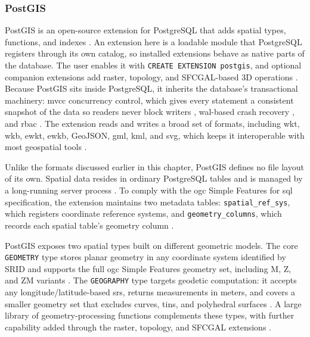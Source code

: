 \subsubsection{PostGIS}
\label{background:spatial-data-formats-and-storage-models:full-database-engines:postgis}
PostGIS is an open-source extension for PostgreSQL that adds spatial types, functions, and indexes \parencite{postgis2024_manual_34}. An extension here is a loadable module that PostgreSQL registers through its own catalog, so installed extensions behave as native parts of the database. The user enables it with \texttt{CREATE EXTENSION postgis}, and optional companion extensions add raster, topology, and SFCGAL-based 3D operations \parencite{postgis2024_manual_34}. Because PostGIS sits inside PostgreSQL, it inherits the database's transactional machinery: \acrshort{mvcc} concurrency control, which gives every statement a consistent snapshot of the data so readers never block writers \parencite{postgresql2024_concurrency_control}, \acrshort{wal}-based crash recovery \parencite{postgresql2024_wal}, and \acrfull{rbac} \parencite{postgresql2024_roles}. The extension reads and writes a broad set of formats, including \acrshort{wkt}, \acrshort{wkb}, \acrfull{ewkt}, \acrfull{ewkb}, GeoJSON, \acrshort{gml}, \acrfull{kml}, and \acrfull{svg}, which keeps it interoperable with most geospatial tools \parencite{postgis2024_manual_34}.

Unlike the formats discussed earlier in this chapter, PostGIS defines no file layout of its own. Spatial data resides in ordinary PostgreSQL tables \parencite{postgis2024_manual_34} and is managed by a long-running server process \parencite{postgresql2024_architectural_fundamentals}. To comply with the \acrshort{ogc} Simple Features for \acrshort{sql} specification, the extension maintains two metadata tables: \texttt{spatial\_ref\_sys}, which registers coordinate reference systems, and \texttt{geometry\_columns}, which records each spatial table's geometry column \parencite{postgis2024_manual_34}.

PostGIS exposes two spatial types built on different geometric models. The core \texttt{GEOMETRY} type stores planar geometry in any coordinate system identified by SRID and supports the full \acrshort{ogc} Simple Features geometry set, including M, Z, and ZM variants \parencite{postgis2024_manual_34}. The \texttt{GEOGRAPHY} type targets geodetic computation: it accepts any longitude/latitude-based \acrshort{srs}, returns measurements in meters, and covers a smaller geometry set that excludes curves, \acrshort{tin}s, and polyhedral surfaces \parencite{postgis2024_manual_34}. A large library of geometry-processing functions complements these types, with further capability added through the raster, topology, and SFCGAL extensions \parencite{postgis2024_manual_34}.

